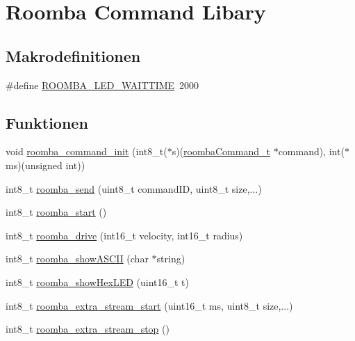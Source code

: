 \hypertarget{group__roomba__command}{\section{Roomba Command Libary}
\label{group__roomba__command}
}
\subsection*{Makrodefinitionen}
\begin{DoxyCompactItemize}
\item 
\#define \hyperlink{group__roomba__command_ga37c9f1a8302deafd88328c5e93c0be34}{R\-O\-O\-M\-B\-A\-\_\-\-L\-E\-D\-\_\-\-W\-A\-I\-T\-T\-I\-M\-E}~2000
\end{DoxyCompactItemize}
\subsection*{Funktionen}
\begin{DoxyCompactItemize}
\item 
void \hyperlink{group__roomba__command_ga5069285ea70869042d10d46ba956609e}{roomba\-\_\-command\-\_\-init} (int8\-\_\-t($\ast$s)(\hyperlink{group__roomba__def_gae2455d95f239542954d232e31bb04a0e}{roomba\-Command\-\_\-t} $\ast$command), int($\ast$ms)(unsigned int))
\item 
int8\-\_\-t \hyperlink{group__roomba__command_ga0683a37734e0cb2bcf0cf02cbed5bd6d}{roomba\-\_\-send} (uint8\-\_\-t command\-I\-D, uint8\-\_\-t size,...)
\item 
int8\-\_\-t \hyperlink{group__roomba__command_ga0009ab88976753a51dad258f6cd24b56}{roomba\-\_\-start} ()
\item 
int8\-\_\-t \hyperlink{group__roomba__command_ga05d56faf8c83be76e70244faf6fad11d}{roomba\-\_\-drive} (int16\-\_\-t velocity, int16\-\_\-t radius)
\item 
int8\-\_\-t \hyperlink{group__roomba__command_ga9cd8ae0025cf3c68650685e9be9a6d98}{roomba\-\_\-show\-A\-S\-C\-I\-I} (char $\ast$string)
\item 
int8\-\_\-t \hyperlink{group__roomba__command_gae7347769338e61069cf91e5c2be64ad7}{roomba\-\_\-show\-Hex\-L\-E\-D} (uint16\-\_\-t t)
\item 
int8\-\_\-t \hyperlink{group__roomba__command_gae99397efcf4eb54176e81f509a87bc56}{roomba\-\_\-extra\-\_\-stream\-\_\-start} (uint16\-\_\-t ms, uint8\-\_\-t size,...)
\item 
int8\-\_\-t \hyperlink{group__roomba__command_ga81d22279a9c3a24327a5107be58a7ab0}{roomba\-\_\-extra\-\_\-stream\-\_\-stop} ()
\end{DoxyCompactItemize}



